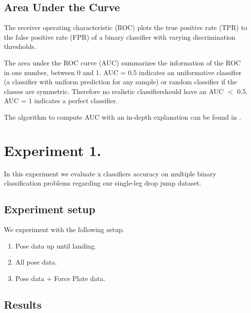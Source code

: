 \subsection{Area Under the Curve}
The receiver operating characteristic (ROC) plots the true positive rate (TPR) to the false positive rate (FPR) of a binary classifier with varying discrimination thresholds.

The area under the ROC curve (AUC) summarizes the information of the ROC in one number, between 0 and 1. AUC = 0.5 indicates an uniformative classifier (a classifier with uniform prediction for any sample) or random classifier if the classes are symmetric. Therefore no realistic classifiershould have an AUC $<$ 0.5. AUC = 1 indicates a perfect classifier.

The algorithm to compute AUC with an in-depth explanation can be found in \cite{Fawcett2006AnAnalysis}.

\section{Experiment 1.}
In this experiment we evaluate x classifiers accuracy on multiple binary classification problems regarding our single-leg drop jump dataset.

\subsection{Experiment setup}
We experiment with the following setup.

\begin{enumerate}[label=(\Alph*)]
	\item Pose data up until landing.
	\item All pose data.
	\item Pose data + Force Plate data.
\end{enumerate}

\subsection{Results}
\subsection{}

